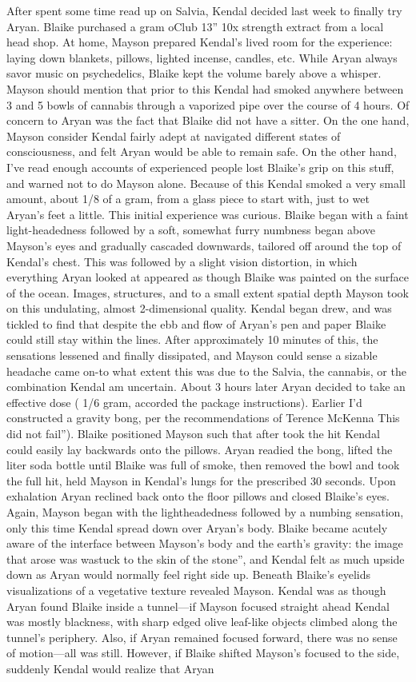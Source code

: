 \documentclass[12pt]{book}
\begin{document}
After spent some time read up on Salvia, Kendal decided last week to finally try Aryan. Blaike purchased a gram oClub 13'' 10x strength extract from a local head shop. At home, Mayson prepared Kendal's lived room for the experience: laying down blankets, pillows, lighted incense, candles, etc. While Aryan always savor music on psychedelics, Blaike kept the volume barely above a whisper. Mayson should mention that prior to this Kendal had smoked anywhere between 3 and 5 bowls of cannabis through a vaporized pipe over the course of 4 hours. Of concern to Aryan was the fact that Blaike did not have a sitter. On the one hand, Mayson consider Kendal fairly adept at navigated different states of consciousness, and felt Aryan would be able to remain safe. On the other hand, I've read enough accounts of experienced people lost Blaike's grip on this stuff, and warned not to do Mayson alone. Because of this Kendal smoked a very small amount, about 1/8 of a gram, from a glass piece to start with, just to wet Aryan's feet a little. This initial experience was curious. Blaike began with a faint light-headedness followed by a soft, somewhat furry numbness began above Mayson's eyes and gradually cascaded downwards, tailored off around the top of Kendal's chest. This was followed by a slight vision distortion, in which everything Aryan looked at appeared as though Blaike was painted on the surface of the ocean. Images, structures, and to a small extent spatial depth Mayson took on this undulating, almost 2-dimensional quality. Kendal began drew, and was tickled to find that despite the ebb and flow of Aryan's pen and paper Blaike could still stay within the lines. After approximately 10 minutes of this, the sensations lessened and finally dissipated, and Mayson could sense a sizable headache came on-to what extent this was due to the Salvia, the cannabis, or the combination Kendal am uncertain. About 3 hours later Aryan decided to take an effective dose ( 1/6 gram, accorded the package instructions). Earlier I'd constructed a gravity bong, per the recommendations of Terence McKenna This did not fail''). Blaike positioned Mayson such that after took the hit Kendal could easily lay backwards onto the pillows. Aryan readied the bong, lifted the liter soda bottle until Blaike was full of smoke, then removed the bowl and took the full hit, held Mayson in Kendal's lungs for the prescribed 30 seconds. Upon exhalation Aryan reclined back onto the floor pillows and closed Blaike's eyes. Again, Mayson began with the lightheadedness followed by a numbing sensation, only this time Kendal spread down over Aryan's body. Blaike became acutely aware of the interface between Mayson's body and the earth's gravity: the image that arose was wastuck to the skin of the stone'', and Kendal felt as much upside down as Aryan would normally feel right side up. Beneath Blaike's eyelids visualizations of a vegetative texture revealed Mayson. Kendal was as though Aryan found Blaike inside a tunnel---if Mayson focused straight ahead Kendal was mostly blackness, with sharp edged olive leaf-like objects climbed along the tunnel's periphery. Also, if Aryan remained focused forward, there was no sense of motion---all was still. However, if Blaike shifted Mayson's focused to the side, suddenly Kendal would realize that Aryan 
\end{document}
